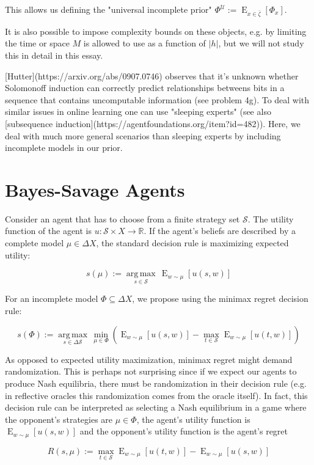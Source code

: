 \documentclass[a4paper]{article}
\DeclareMathOperator{\E}{E}
\newcommand{\Argmax}[1]{\underset{#1}{\operatorname{arg\,max}}\,}
\newcommand{\Reals}{\mathbb{R}}
\newcommand{\Abs}[1]{\lvert #1 \rvert}
\newcommand{\UTM}{\mathcal{U}}
\newcommand{\SP}[1]{\Delta #1}
\newcommand{\Strat}{\mathcal{S}}
\begin{document}
This allows us defining the "universal incomplete prior" ${\Phi^\UTM:=\E_{x \in \bar{\zeta}}[\Phi_x]}$.

It is also possible to impose complexity bounds on these objects, e.g. by limiting the time or space ${M}$ is allowed to use as a function of ${\Abs{h}}$, but we will not study this in detail in this essay.

[Hutter](https://arxiv.org/abs/0907.0746) observes that it's unknown whether Solomonoff induction can correctly predict relationships betweens bits in a sequence that contains uncomputable information (see problem 4g). To deal with similar issues in online learning one can use "sleeping experts" (see also [subsequence induction](https://agentfoundations.org/item?id=482)). Here, we deal with much more general scenarios than sleeping experts by including incomplete models in our prior.

\section{Bayes-Savage Agents}

Consider an agent that has to choose from a finite strategy set ${\Strat}$. The utility function of the agent is ${u: \Strat \times X \rightarrow \Reals}$. If the agent's beliefs are described by a complete model ${\mu \in \SP{X}}$, the standard decision rule is maximizing expected utility: 

$${s(\mu):=\Argmax{s \in \Strat} \E_{w \sim \mu}[u(s,w)]}$$

For an incomplete model ${\Phi \subseteq \SP{X}}$, we propose using the minimax regret decision rule:

$$s(\Phi):=\Argmax{s \in \SP{\Strat}} \min_{\mu \in \Phi}(\E_{w \sim \mu}[u(s,w)] - \max_{t \in \Strat} \E_{w \sim \mu}[u(t,w)])$$

As opposed to expected utility maximization, minimax regret might demand randomization. This is perhaps not surprising since if we expect our agents to produce Nash equilibria, there must be randomization in their decision rule (e.g. in reflective oracles this randomization comes from the oracle itself). In fact, this decision rule can be interpreted as selecting a Nash equilibrium in a game where the opponent's strategies are ${\mu \in \Phi}$, the agent's utility function is ${\E_{w \sim \mu}[u(s,w)]}$ and the opponent's utility function is the agent's regret 

$${R(s,\mu):=\max_{t \in \Strat} \E_{w \sim \mu}[u(t,w)]} - \E_{w \sim \mu}[u(s,w)]$$
\end{document}

